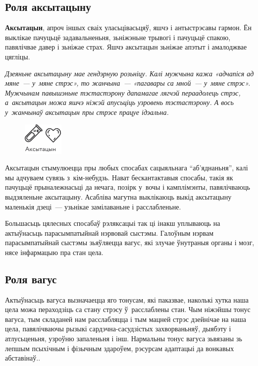 \subsection*{Роля аксытацыну}

\textbf{Аксытацын}, апроч іншых сваіх уласьцівасьцяў, яшчэ і антыстрэсавы гармон. Ён выклікае пачуцьцё задавальненьня, зьніжэньне трывогі і пачуцьцё спакою, павялічвае давер і зьніжае страх. Яшчэ аксытацын зьніжае апэтыт і амалоджвае цягліцы. 

\emph{Дзеяньне аксытацыну мае гендэрную розьніцу. Калі мужчына кажа «адчапіся ад мяне~--- у~мяне стрэс», то жанчына~--- «пагавары са мной~--- у~мяне стрэс». Мужчынам павышэньне тэстастэрону дапамагае лягчэй пераадолець стрэс, а~аксытацын можа яшчэ ніжэй апусьціць узровень тэстастэрону. А вось у~жанчынаў аксытацын пры стрэсе працуе ідэальна.}

\begin{figure}[htb!]
  \centering
  \includegraphics[scale=1.5]{willpower/ch7/19.pdf}
\end{figure}

Аксытацын стымулюецца пры любых спосабах сацыяльнага ``аб'яднаньня'', калі мы адчуваем сувязь з~кім-небудзь. Нават бескантактавыя спосабы, такія як пачуцьцё прыналежнасьці да нечага, позірк у~вочы і камплімэнты, павялічваюць выдзяленьне аксытацыну. Асабліва магутна выклікаюць выкід аксытацыну маленькія дзеці~--- узьнікае замілаваньне і расслабленьне. 

Большасьць цялесных спосабаў рэляксацыі так ці інакш уплываюць на актыўнасьць парасымпатыйнай нэрвовай сыстэмы. Галоўным нэрвам парасымпатыйнай сыстэмы зьяўляецца вагус, які злучае ўнутраныя органы і мозг, нясе інфармацыю пра стан цела. 

\subsection*{Роля вагус}

Актыўнасьць вагуса вызначаецца яго тонусам, які паказвае, наколькі хутка наша цела можа пераходзіць са стану стрэсу ў~расслаблены стан. Чым ніжэйшы тонус вагуса, тым складаней нам расслабляцца і тым мацней стрэс дзейнічае на наша цела, павялічваючы рызыкі сардэчна-сасудзістых захворваньняў, дыябэту і атлусьценьня, узроўню запаленьня і інш. Нармальны тонус вагуса зьвязаны зь лепшым псыхічным і фізычным здароўем, рэсурсам адаптацыі да вонкавых абставінаў..


